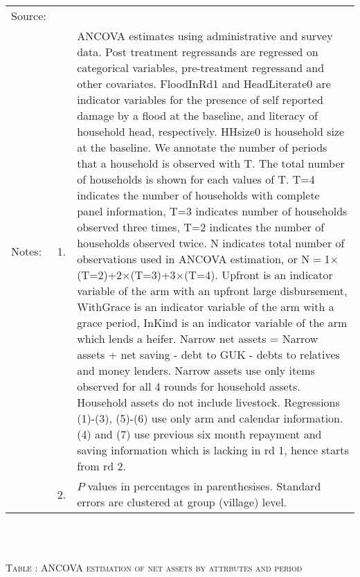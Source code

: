 \begin{minipage}[t]{14cm}
\begin{tabular}{>{\hfill\scriptsize}p{1cm}<{}>{\hfill\scriptsize}p{.25cm}<{}>{\scriptsize}p{12cm}<{\hfill}}
Source:& \multicolumn{2}{l}{\scriptsize Estimated with GUK administrative and survey data.}\\
Notes: & 1. & ANCOVA estimates using administrative and survey data. Post treatment regressands are regressed on categorical variables, pre-treatment regressand and other covariates. \textsf{FloodInRd1} and \textsf{HeadLiterate0} are indicator variables for the presence of self reported damage by a flood at the baseline, and literacy of household head, respectively. \textsf{HHsize0} is household size at the baseline. We annotate the number of periods that a household is observed with \textsf{T}. The total number of households is shown for each values of \textsf{T}. \textsf{T=4} indicates the number of households with complete panel information, \textsf{T=3} indicates number of households observed three times, \textsf{T=2} indicates the number of households observed twice. \textsf{N} indicates total number of observations used in ANCOVA estimation, or \textsf{N$=$1$\times$(T=2)+2$\times$(T=3)+3$\times$(T=4)}.  \textsf{Upfront} is an indicator variable of the arm with an upfront large disbursement, \textsf{WithGrace} is an indicator variable of the arm with a grace period, \textsf{InKind} is an indicator variable of the arm which lends a heifer. Narrow net assets = Narrow assets + net saving - debt to GUK - debts to relatives and money lenders. Narrow assets use only items observed for all 4 rounds for household assets. Household assets do not include livestock. Regressions (1)-(3), (5)-(6) use only arm and calendar information. (4) and (7) use previous six month repayment and saving information which is lacking in rd 1, hence starts from rd 2.\\
& 2. &  $P$ values in percentages in parenthesises. Standard errors are clustered at group (village) level. %
 \end{tabular}
\end{minipage} \\\\\hspace{-1cm}\begin{minipage}[t]{14cm} \hfil\textsc{\normalsize Table \thetable: ANCOVA estimation of net assets by attrbutes and period\label{tab ANCOVA net assets timevarying attributes}}\\ \setlength{\tabcolsep}{1pt}
  \setlength{\baselineskip}{8pt}
  \renewcommand{\arraystretch}{.55}

\end{minipage}
